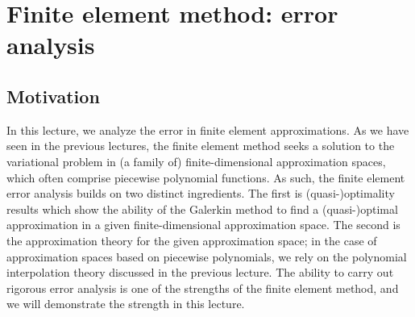 \chapter{Finite element method: error analysis}
\label{ch:fe_theory}

\disclaimer

\section{Motivation}
In this lecture, we analyze the error in finite element approximations. As we have seen in the previous lectures, the finite element method seeks a solution to the variational problem in (a family of) finite-dimensional approximation spaces, which often comprise piecewise polynomial functions. As such, the finite element error analysis builds on two distinct ingredients. The first is (quasi-)optimality results which show the ability of the Galerkin method to find a (quasi-)optimal approximation in a given finite-dimensional approximation space.  The second is the approximation theory for the given approximation space; in the case of approximation spaces based on piecewise polynomials, we rely on the polynomial interpolation theory discussed in the previous lecture. The ability to carry out rigorous error analysis is one of the strengths of the finite element method, and we will demonstrate the strength in this lecture.

